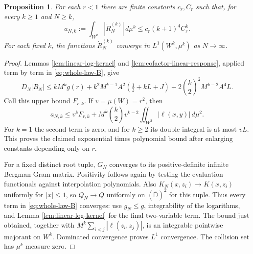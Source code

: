 \documentclass[11pt]{article}
\newtheorem{proposition}[theorem]{Proposition}
\theoremstyle{remark}\newtheorem{remark}[theorem]{Remark}
\begin{document}
\begin{proposition}\label{prop:response-all-order-envelope}
For each $r<1$ there are finite constants $c_r,C_r$ such that, for every
$k\ge1$ and $N\ge k$,
\[
 a_{N,k}:=\int_{W^k}|\dot R_N^{(k)}|\,d\mu^k
       \le c_r(k+1)^4C_r^k.
\]
For each fixed $k$, the functions $\dot R_N^{(k)}$ converge in
$L^1(W^k,\mu^k)$ as $N\to\infty$.
\end{proposition}
\begin{proof}
Lemmas \ref{lem:linear-log-kernel} and
\ref{lem:cofactor-linear-response}, applied term by term in
\eqref{eq:whole-law-B}, give
\[
 D_N|B_N|
 \le kM^kg(r)
  + k^2M^{k-1}A^2(\tfrac12+kL+J)
  +2\binom{k}{2}^2M^{k-2}A^4L.
\]
Call this upper bound $F_{r,k}$. If $v=\mu(W)=r^2$, then
\[
 a_{N,k}\le v^kF_{r,k}
       +M^k\binom{k}{2}v^{k-2}
          \iint_{W^2}|\ell(x,y)|\,d\mu^2.
\]
For $k=1$ the second term is zero, and for $k\ge2$ its double integral
is at most $vL$. This proves the claimed exponential times polynomial
bound after enlarging constants depending only on $r$.

For a fixed distinct root tuple, $G_N$ converges to its positive-definite
infinite Bergman Gram matrix. Positivity follows again by testing the
evaluation functionals against interpolation polynomials. Also
$K_N(x,z_i)\to K(x,z_i)$ uniformly for $|x|\le1$, so $Q_N\to Q$
uniformly on $(\overline{\mathbb D})^2$ for this tuple. Thus every term
in \eqref{eq:whole-law-B} converges: use $g_N\le g$, integrability of
the logarithms, and Lemma \ref{lem:linear-log-kernel} for the final
two-variable term. The bound just obtained, together with
$M^k\sum_{i<j}|\ell(z_i,z_j)|$, is an integrable pointwise majorant
on $W^k$. Dominated convergence proves $L^1$ convergence. The collision
set has $\mu^k$ measure zero.
\end{proof}
\end{document}
